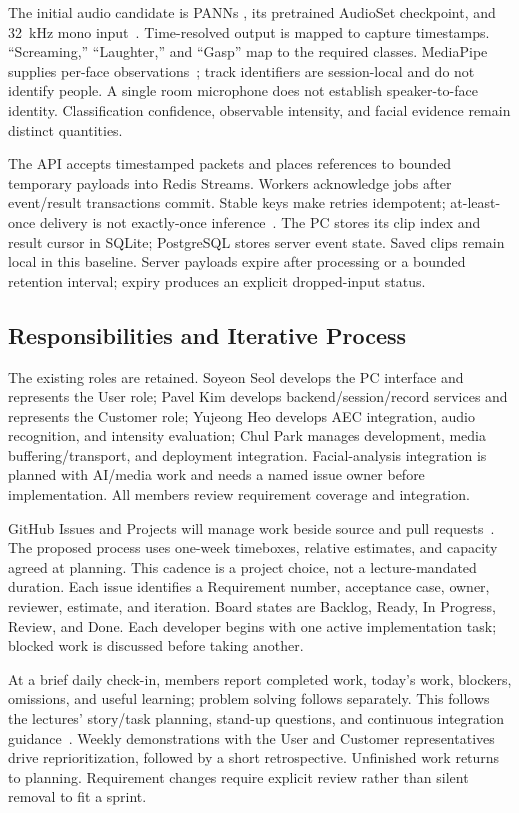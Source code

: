 The initial audio candidate is PANNs , its pretrained AudioSet checkpoint, and 32~kHz mono input~\cite{panns,pannsweights}. Time-resolved output is mapped to capture timestamps. ``Screaming,'' ``Laughter,'' and ``Gasp'' map to the required classes. MediaPipe supplies per-face observations~\cite{mediapipe}; track identifiers are session-local and do not identify people. A single room microphone does not establish speaker-to-face identity. Classification confidence, observable intensity, and facial evidence remain distinct quantities.

The API accepts timestamped packets and places references to bounded temporary payloads into Redis Streams. Workers acknowledge jobs after event/result transactions commit. Stable keys make retries idempotent; at-least-once delivery is not exactly-once inference~\cite{redis}. The PC stores its clip index and result cursor in SQLite; PostgreSQL stores server event state. Saved clips remain local in this baseline. Server payloads expire after processing or a bounded retention interval; expiry produces an explicit dropped-input status.

\subsection{Responsibilities and Iterative Process}
The existing roles are retained. Soyeon Seol develops the PC interface and represents the User role; Pavel Kim develops backend/session/record services and represents the Customer role; Yujeong Heo develops AEC integration, audio recognition, and intensity evaluation; Chul Park manages development, media buffering/transport, and deployment integration. Facial-analysis integration is planned with AI/media work and needs a named issue owner before implementation. All members review requirement coverage and integration.

GitHub Issues and Projects will manage work beside source and pull requests~\cite{projects}. The proposed process uses one-week timeboxes, relative estimates, and capacity agreed at planning. This cadence is a project choice, not a lecture-mandated duration. Each issue identifies a Requirement number, acceptance case, owner, reviewer, estimate, and iteration. Board states are Backlog, Ready, In Progress, Review, and Done. Each developer begins with one active implementation task; blocked work is discussed before taking another.

At a brief daily check-in, members report completed work, today's work, blockers, omissions, and useful learning; problem solving follows separately. This follows the lectures' story/task planning, stand-up questions, and continuous integration guidance~\cite{lifecycle,management}. Weekly demonstrations with the User and Customer representatives drive reprioritization, followed by a short retrospective. Unfinished work returns to planning. Requirement changes require explicit review rather than silent removal to fit a sprint.

